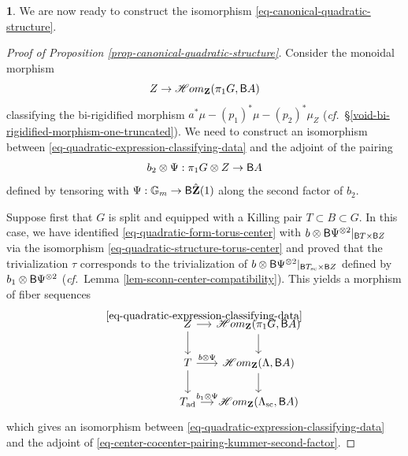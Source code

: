 \documentclass[10pt,english,reqno]{amsart}
\newcommand{\integers}{\mathbf Z}
\newcommand{\SHom}{\mathscr{H}om}
\newcommand{\deloop}{\textnormal{\textsf{B}}}
\newcommand{\sconn}{\textnormal{sc}}
\newcommand{\adjoint}{\textnormal{ad}}
\theoremstyle{definition}
\numberwithin{equation}{section}
\newtheorem{untitledsubsubsection}[subsubsection]{}
\newenvironment{void}
{\begin{untitledsubsubsection}}
{\end{untitledsubsubsection}}
\begin{document}
\begin{void}
\label{void-proof-prop-canonical-quadratic-structure}
We are now ready to construct the isomorphism \eqref{eq-canonical-quadratic-structure}.
\begin{proof}[Proof of Proposition \ref{prop-canonical-quadratic-structure}]
Consider the monoidal morphism
\begin{equation}
\label{eq-quadratic-expression-classifying-data}
Z \rightarrow \SHom_{\integers}(\pi_1 G, \deloop A)
\end{equation}
classifying the bi-rigidified morphism $a^*\mu - (p_1)^*\mu - (p_2)^*\mu_Z$ (\emph{cf.}~\S\ref{void-bi-rigidified-morphism-one-truncated}). We need to construct an isomorphism between \eqref{eq-quadratic-expression-classifying-data} and the adjoint of the pairing
\begin{equation}
\label{eq-center-cocenter-pairing-kummer-second-factor}
b_2\otimes\Psi : \pi_1 G \otimes Z \rightarrow \deloop A
\end{equation}
defined by tensoring with $\Psi : \mathbb G_m \rightarrow \deloop\hat{\integers}(1)$ along the second factor of $b_2$.

Suppose first that $G$ is split and equipped with a Killing pair $T\subset B\subset G$. In this case, we have identified \eqref{eq-quadratic-form-torus-center} with $b\otimes \deloop\Psi^{\otimes 2}|_{\deloop T \times \deloop Z}$ via the isomorphism \eqref{eq-quadratic-structure-torus-center} and proved that the trivialization $\tau$ corresponds to the trivialization of $b\otimes \deloop\Psi^{\otimes 2}|_{\deloop T_{\sconn} \times \deloop Z}$ defined by $b_1 \otimes \deloop\Psi^{\otimes 2}$ (\emph{cf.}~Lemma \ref{lem-sconn-center-compatibility}). This yields a morphism of fiber sequences
\begin{equation}
\label{eq-quadratic-structure-fiber-sequence-map}
\begin{tikzcd}[column sep = 1em]
	Z \ar[r, "\eqref{eq-quadratic-expression-classifying-data}"]\ar[d] & \SHom_{\integers}(\pi_1G, \deloop A) \ar[d] \\
	T \ar[r, "b \otimes \Psi"]\ar[d] & \SHom_{\integers}(\Lambda, \deloop A) \ar[d] \\
	T_{\adjoint} \ar[r, "b_1\otimes \Psi"] & \SHom_{\integers}(\Lambda_{\sconn}, \deloop A)
\end{tikzcd}
\end{equation}
which gives an isomorphism between \eqref{eq-quadratic-expression-classifying-data} and the adjoint of \eqref{eq-center-cocenter-pairing-kummer-second-factor}.


\end{proof}
\end{void}
\end{document}

